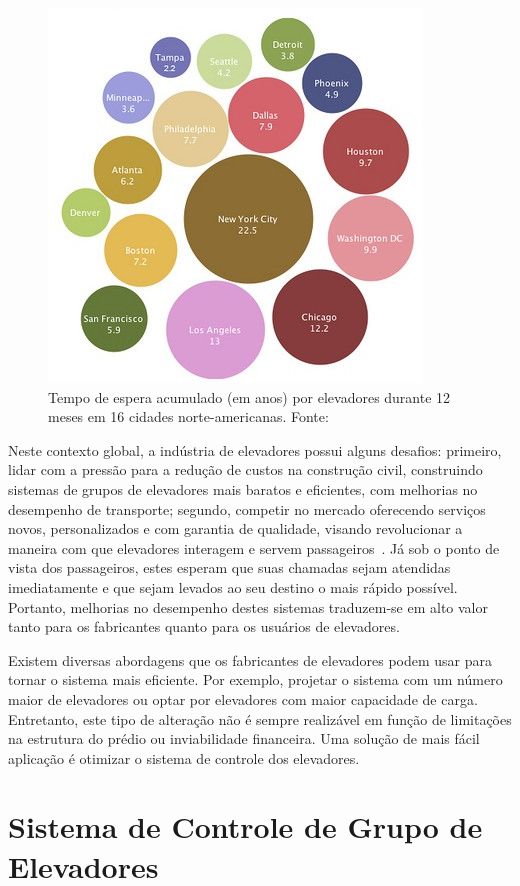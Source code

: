 \begin{figure}[htb!]
\centering\includegraphics{img/time-cost.jpg}
\caption{\label{fig:fig1}Tempo de espera acumulado (em anos) por elevadores durante 12 meses em 16 cidades norte-americanas. Fonte:~\cite{IBM10}}
\end{figure}

Neste contexto global, a indústria de elevadores possui alguns desafios: primeiro, lidar com a pressão para a redução de custos na construção civil, construindo sistemas de grupos de elevadores mais baratos e eficientes, com melhorias no desempenho de transporte; segundo, competir no mercado oferecendo serviços novos, personalizados e com garantia de qualidade, visando revolucionar a maneira com que elevadores interagem e servem passageiros~\cite{KOEHLEROTTIGER02}. Já sob o ponto de vista dos passageiros, estes esperam que suas chamadas sejam atendidas imediatamente e que sejam levados ao seu destino o mais rápido possível. Portanto, melhorias no desempenho destes sistemas traduzem-se em alto valor tanto para os fabricantes quanto para os usuários de elevadores.

Existem diversas abordagens que os fabricantes de elevadores podem usar para tornar o sistema mais eficiente. Por exemplo, projetar o sistema com um número maior de elevadores ou optar por elevadores com maior capacidade de carga. Entretanto, este tipo de alteração não é sempre realizável em função de limitações na estrutura do prédio ou inviabilidade financeira. Uma solução de mais fácil aplicação é otimizar o sistema de controle dos elevadores.

\section{Sistema de Controle de Grupo de Elevadores}

